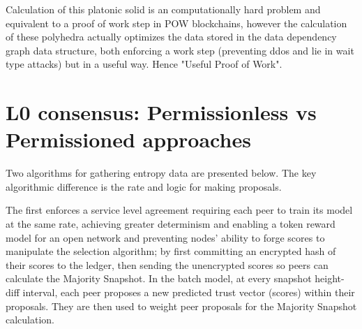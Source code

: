 \documentclass{article}
\begin{document}
Calculation of this platonic solid is an computationally hard problem and equivalent to a proof of work step in POW blockchains, however the calculation of these polyhedra actually optimizes the data stored in the data dependency graph data structure, both enforcing a work step (preventing ddos and lie in wait type attacks) but in a useful way. Hence "Useful Proof of Work".



\section {L0 consensus: Permissionless vs Permissioned approaches}
Two algorithms for gathering entropy data are presented below. The key algorithmic difference is the rate and logic for making proposals. 

The first enforces a service level agreement requiring each peer to train its model at the same rate, achieving greater determinism and enabling a token reward model for an open network and preventing nodes' ability to forge scores to manipulate the selection algorithm; by first committing an encrypted hash of their scores to the ledger, then sending the unencrypted scores so peers can calculate the Majority Snapshot. In the batch model, at every snapshot height-diff interval, each peer proposes a new predicted trust vector (scores) within their proposals. They are then used to weight peer proposals for the Majority Snapshot calculation.
\end{document}
